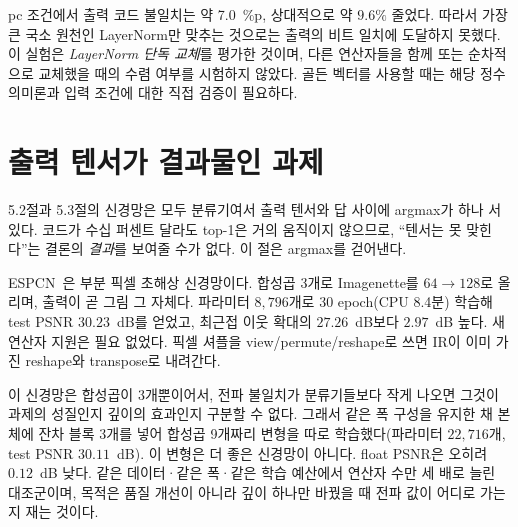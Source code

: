\documentclass[11pt,a4paper,oneside]{report}
\newcommand{\fittable}[1]{\adjustbox{max width=\textwidth}{#1}}
\begin{document}
\begin{table}[!t]
\caption[LayerNorm 정수 에뮬레이션]{시뮬레이터의 LayerNorm을 정수에 충실하게 바꾼 결과(ViT-128/6, $10{,}000$장). 각 방식의 두 행
사이에서 정수 프로그램은 바뀌지 않았고 시뮬레이터의 LayerNorm만 다르다. 로짓 절대차 평균은 \textsc{pc}에서
$0.119 \rightarrow 0.091$, \textsc{pt}에서 $0.118 \rightarrow 0.093$으로 줄어든다.}
\label{tab:layernorm}
\centering
\footnotesize
\fittable{}
\end{table}

pc 조건에서 출력 코드 불일치는 약 7.0~\%p, 상대적으로 약 $9.6\%$ 줄었다. 따라서 가장 큰
국소 원천인 LayerNorm만 맞추는 것으로는 출력의 비트 일치에 도달하지 못했다. 이 실험은
\emph{LayerNorm 단독 교체}를 평가한 것이며, 다른 연산자들을 함께 또는 순차적으로 교체했을 때의
수렴 여부를 시험하지 않았다. 골든 벡터를 사용할 때는 해당 정수 의미론과 입력 조건에 대한
직접 검증이 필요하다.

\section{출력 텐서가 결과물인 과제}

5.2절과 5.3절의 신경망은 모두 분류기여서 출력 텐서와 답 사이에 argmax가 하나 서 있다. 코드가 수십 퍼센트
달라도 top-1은 거의 움직이지 않으므로, ``텐서는 못 맞힌다''는 결론의 \emph{결과}를 보여줄 수가 없다. 이
절은 argmax를 걷어낸다.

ESPCN~\cite{espcn}은 부분 픽셀 초해상 신경망이다. 합성곱 3개로 Imagenette를 $64 \rightarrow 128$로 올리며,
출력이 곧 그림 그 자체다. 파라미터 $8{,}796$개로 30 epoch(CPU 8.4분) 학습해 test PSNR $30.23$~dB를 얻었고,
최근접 이웃 확대의 $27.26$~dB보다 $2.97$~dB 높다. 새 연산자 지원은 필요 없었다. 픽셀 셔플을
view/permute/reshape로 쓰면 IR이 이미 가진 reshape와 transpose로 내려간다.

이 신경망은 합성곱이 3개뿐이어서, 전파 불일치가 분류기들보다 작게 나오면 그것이 과제의 성질인지 깊이의
효과인지 구분할 수 없다. 그래서 같은 폭 구성을 유지한 채 본체에 잔차 블록 3개를 넣어 합성곱 9개짜리 변형을
따로 학습했다(파라미터 $22{,}716$개, test PSNR $30.11$~dB). 이 변형은 더 좋은 신경망이 아니다. float PSNR은
오히려 $0.12$~dB 낮다. 같은 데이터·같은 폭·같은 학습 예산에서 연산자 수만 세 배로 늘린 대조군이며, 목적은
품질 개선이 아니라 깊이 하나만 바꿨을 때 전파 값이 어디로 가는지 재는 것이다.

\begin{table}[!t]
\caption[밀집 출력 과제: ESPCN $\times 2$, 두 깊이]{출력 텐서가 결과물인 과제: Imagenette에서의 ESPCN $\times 2$,
이미지 $3{,}925$장, 이미지당 출력값 $49{,}152$개를 같은 폭 구성의 두 깊이(합성곱 3개와 9개)에서 측정했다.
PSNR은 $[0,1]$ 범위의 dB이며 배포와 똑같이 출력을 clip한 뒤 이미지별로 재고 평균했다. $\max|\Delta c|$는
정수 실행과 시뮬레이터의 출력 픽셀 코드가 벌어진 최대 레벨 수다.}
\label{tab:dense}
\centering
\footnotesize
\fittable{}
\end{table}
\end{document}
